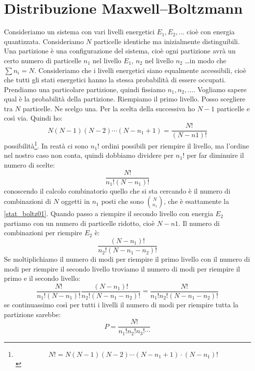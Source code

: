 \section{Distribuzione Maxwell--Boltzmann}
Consideriamo un sistema con vari livelli energetici $E_1, E_2, \ldots$ cioè con energia quantizzata. Consideriamo $N$ particelle identiche ma inizialmente distinguibili. Una partizione è una configurazione del sistema, cioè ogni partizione avrà un certo numero di particelle $n_1$ nel livello $E_1$, $n_2$ nel livello $n_2$ \ldots in modo che $\sum n_i=N$. Consideriamo che i livelli energetici siano equalmente accessibili, cioè che tutti gli stati energetici hanno la stessa probabilità di essere occupati. Prendiamo una particolare partizione, quindi fissiamo $n_1, n_2, \ldots$. Vogliamo sapere qual è la probabilità della partizione. Riempiamo il primo livello. Posso scegliere tra $N$ particelle. Ne scelgo una. Per la scelta della successiva ho $N-1$ particelle e così via. Quindi ho:
\begin{equation}
N(N-1)(N-2)\cdots(N-n_1+1)=\frac{N!}{\left(N-n1\right)!}
\end{equation}
possibilità\footnote{\begin{equation*}
N!=N(N-1)(N-2)\cdots(N-n_1+1)\cdot(N-n_1)!
\end{equation*}
}. In reatà ci sono $n_1!$ ordini possibili per riempire il livello, ma l'ordine nel nostro caso non conta, quindi dobbiamo dividere per $n_1!$ per far diminuire il numero di scelte:
\begin{equation}
\frac{N!}{n_1!(N-n_1)!}
\label{stat_boltz01}
\end{equation}
conoscendo il calcolo combinatorio quello che si sta cercando è il numero di combinazioni di $N$ oggetti in $n_1$ posti che sono $\binom{N}{n_1}$, che è esattamente la \eqref{stat_boltz01}. Quando passo a riempire il secondo livello con energia $E_2$ partiamo con un numero di particelle ridotto, cioè $N-n1$. Il numero di combinazioni per riempire $E_2$ è:
\begin{equation}
\frac{(N-n_1)!}{n_2!(N-n_1-n_2)!}
\end{equation}
Se moltiplichiamo il numero di modi per riempire il primo livello con il numero di modi per riempire il secondo livello troviamo il numero di modi per riempire il primo e il secondo livello:
\begin{equation}
\frac{N!}{n_1!(N-n_1)!}\frac{(N-n_1)!}{n_2!(N-n_1-n_2)!}=\frac{N!}{n_1!n_2!(N-n_1-n_2)!}
\end{equation}
se continuassimo così per tutti i livelli il numero di modi per riempire tutta la partizione sarebbe:
\begin{equation}
P=\frac{N!}{n_1!n_2!n_3!\cdots}
\label{stat_001}
\end{equation}
